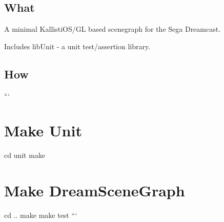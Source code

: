 \subsection*{What}


\begin{DoxyItemize}
\item A minimal Kallisti\+O\+S/\+G\+L based scenegraph for the Sega Dreamcast.
\item Includes lib\+Unit -\/ a unit test/assertion library.
\end{DoxyItemize}

\subsection*{How}

``` \section*{Make Unit}

cd unit make

\section*{Make Dream\+Scene\+Graph}

cd .. make make test ``` 